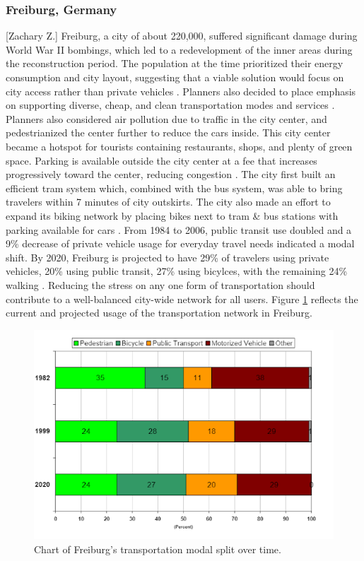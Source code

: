 \documentclass[12pt]{article}                               %
\begin{document}
\subsubsection{Freiburg, Germany}[Zachary Z.]
Freiburg, a city of about 220,000, suffered significant damage during World War II bombings, which led to a redevelopment of the inner areas during the reconstruction period. The population at the time prioritized their energy consumption and city layout, suggesting that a viable solution would focus on city access rather than private vehicles \cite{Rydningen2017OsloCentre}. Planners also decided to place emphasis on supporting diverse, cheap, and clean transportation modes and services \cite{Bindra2006SmartGermany}. Planners also considered air pollution due to traffic in the city center, and pedestrianized the center further to reduce the cars inside. This city center became a hotspot for tourists containing restaurants, shops, and plenty of green space. Parking is available outside the city center at a fee that increases progressively toward the center, reducing congestion \cite{Bindra2006SmartGermany}. The city first built an efficient tram system which, combined with the bus system, was able to bring travelers within 7 minutes of city outskirts. The city also made an effort to expand its biking network by placing bikes next to tram \& bus stations with parking available for cars \cite{Bindra2006SmartGermany}. From 1984 to 2006, public transit use doubled and a 9\% decrease of private vehicle usage for everyday travel needs indicated a modal shift. By 2020, Freiburg is projected to have 29\% of travelers using private vehicles, 20\% using public transit, 27\% using bicylces, with the remaining 24\% walking \cite{Rydningen2017OsloCentre}. Reducing the stress on any one form of transportation should contribute to a well-balanced city-wide network for all users. Figure \ref{img:freiburg_modal_split} reflects the current and projected usage of the transportation network in Freiburg.

\begin{figure}[H]
    \centering
    \includegraphics[width=0.9\columnwidth]{images/freiburg_modal_split.png}
    \caption{Chart of Freiburg's transportation modal split over time.}
    \label{img:freiburg_modal_split}
\end{figure}
\end{document}
